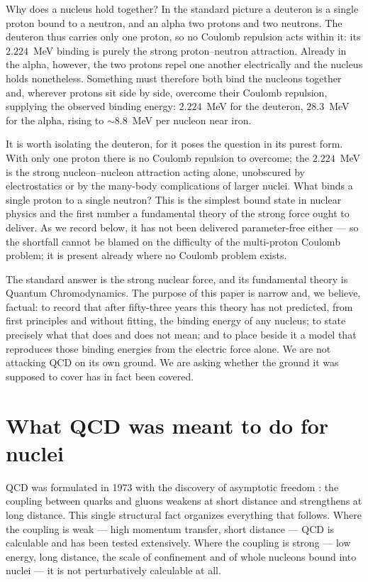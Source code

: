 \documentclass[11pt]{article}
\begin{document}
Why does a nucleus hold together? In the standard picture a deuteron is a single proton bound to a
neutron, and an alpha two protons and two neutrons. The deuteron thus carries only one proton, so no
Coulomb repulsion acts within it: its $2.224$~MeV binding is purely the strong proton--neutron
attraction. Already in the alpha, however, the two protons repel one another electrically and the nucleus
holds nonetheless. Something must therefore both bind the nucleons together and, wherever protons sit
side by side, overcome their Coulomb repulsion, supplying the observed binding energy: $2.224$~MeV for
the deuteron, $28.3$~MeV for the alpha, rising to $\sim 8.8$~MeV per nucleon near iron.

It is worth isolating the deuteron, for it poses the question in its purest form. With only one proton
there is no Coulomb repulsion to overcome; the $2.224$~MeV is the strong nucleon--nucleon attraction
acting alone, unobscured by electrostatics or by the many-body complications of larger nuclei. What
binds a single proton to a single neutron? This is the simplest bound state in nuclear physics and the
first number a fundamental theory of the strong force ought to deliver. As we record below, it has not
been delivered parameter-free either --- so the shortfall cannot be blamed on the difficulty of the
multi-proton Coulomb problem; it is present already where no Coulomb problem exists.

The standard answer is the strong nuclear force, and its fundamental theory is Quantum Chromodynamics.
The purpose of this paper is narrow and, we believe, factual: to record that after fifty-three years this
theory has not predicted, from first principles and without fitting, the binding energy of any nucleus;
to state precisely what that does and does not mean; and to place beside it a model that reproduces those
binding energies from the electric force alone. We are not attacking QCD on its own ground. We are asking
whether the ground it was supposed to cover has in fact been covered.

\section{What QCD was meant to do for nuclei}
\label{sec:mandate}

QCD was formulated in 1973 with the discovery of asymptotic freedom
\cite{gross1973,politzer1973}: the coupling between quarks and gluons weakens at short distance and
strengthens at long distance. This single structural fact organizes everything that follows. Where the
coupling is weak --- high momentum transfer, short distance --- QCD is calculable and has been tested
extensively. Where the coupling is strong --- low energy, long distance, the scale of confinement and of
whole nucleons bound into nuclei --- it is not perturbatively calculable at all.
\end{document}
